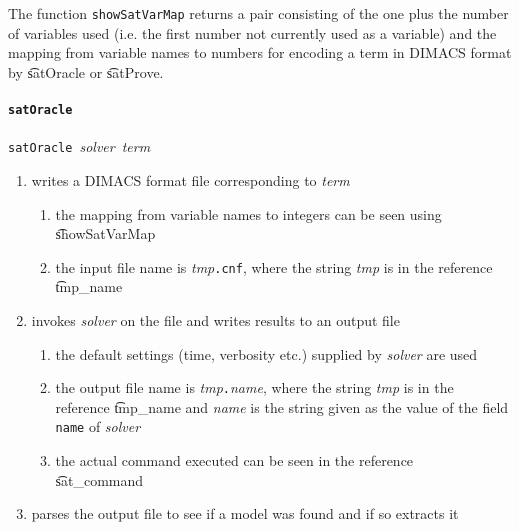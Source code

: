 The function {\small\verb+showSatVarMap+} returns a pair consisting of
the one plus the number of variables used (i.e. the first number not
currently used as a variable) and the mapping from variable names to
numbers for encoding a term in DIMACS format by
\t{satOracle} or \t{satProve}.

\paragraph{\tt satOracle}${}$\\
{\small{\tt satOracle}~{\it solver}~{\it term}}


\begin{enumerate}
\item writes a DIMACS format file corresponding to {\it term}
\begin{enumerate}
\item the mapping from \HOL variable names to integers can be seen using
\t{showSatVarMap}
\item the input file name is {\it tmp}{\tt{.cnf}}, where
the string {\it tmp} is in the reference \t{tmp\_name}
\end{enumerate}


\item invokes {\it solver} on the file and writes results to an output file


\begin{enumerate}
\item the default settings (time, verbosity etc.) supplied by {\it solver}
are used
\item the output file name is {\it tmp}{\tt{.}}{\it{name}}, where
the string {\it tmp} is in the reference \t{tmp\_name}
and {\it name} is the string given as the value of the field {\tt name} of {\it solver}
\item the actual command executed can be seen in the reference \\
\t{sat\_command}
\end{enumerate}


\item parses the output file to see if a model was found and if so extracts it


\end{enumerate}
